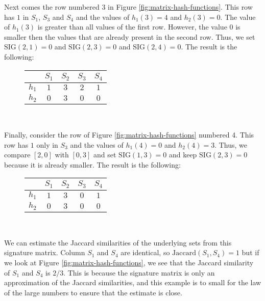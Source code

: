 Next comes the row numbered 3 in Figure \ref{fig:matrix-hash-functions}. This row has $1$ in $S_1$, $S_3$ and $S_4$ and the values of $h_1(3) = 4$ and $h_2(3) = 0$. The value of $h_1(3)$ is greater than all values of the first row. However, the value $0$ is smaller then the values that are already present in the second row. Thus, we set $\text{SIG}(2, 1) = 0$ and $\text{SIG}(2, 3) = 0$ and $\text{SIG}(2, 4) = 0$. The result is the following:

\begin{figure}[H]
\centering
\begin{tabular}{|c||c|c|c|c|}
  \hline
   & $S_1$ & $S_2$ & $S_3$ & $S_4$\\
  \hline
  $h_1$ & $1$ & $3$ & $2$ & $1$ \\ 
  $h_2$ & $0$ & $3$ & $0$ & $0$ \\
  \hline
\end{tabular}
\captionsetup{justification=centering}\\
\label{fig:sig-matrix-3}
\end{figure}

Finally, consider the row of Figure \ref{fig:matrix-hash-functions} numbered 4. This row has $1$ only in $S_3$ and the values of $h_1(4) = 0$ and $h_2(4) = 3$. Thus, we compare $[2, 0]$ with $[0, 3]$ and set $\text{SIG}(1, 3) = 0$ and keep $\text{SIG}(2, 3) = 0$ because it is already smaller. The result is the following:

\begin{figure}[H]
\centering
\begin{tabular}{|c||c|c|c|c|}
  \hline
   & $S_1$ & $S_2$ & $S_3$ & $S_4$\\
  \hline
  $h_1$ & $1$ & $3$ & $0$ & $1$ \\ 
  $h_2$ & $0$ & $3$ & $0$ & $0$ \\
  \hline
\end{tabular}
\captionsetup{justification=centering}\\
\label{fig:sig-matrix-3}
\end{figure}

We can estimate the Jaccard similarities of the underlying sets from this signature matrix. Column $S_1$ and $S_4$ are identical, so $\text{Jaccard}(S_1, S_4) = 1$ but if we look at Figure \ref{fig:matrix-hash-functions}, we see that the Jaccard similarity of $S_1$ and $S_4$ is $2/3$. This is because the signature matrix is only an approximation of the Jaccard similarities, and this example is to small for the law of the large numbers to ensure that the estimate is close.

